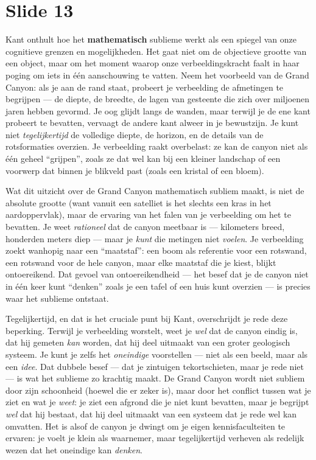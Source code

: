 \documentclass{article}
\begin{document}
\section*{Slide 13}

Kant onthult hoe het \textbf{mathematisch} sublieme werkt als een spiegel van onze cognitieve grenzen en mogelijkheden. Het gaat niet om de objectieve grootte van een object, maar om het moment waarop onze verbeeldingskracht faalt in haar poging om iets in één aanschouwing te vatten. Neem het voorbeeld van de Grand Canyon: als je aan de rand staat, probeert je verbeelding de afmetingen te begrijpen — de diepte, de breedte, de lagen van gesteente die zich over miljoenen jaren hebben gevormd. Je oog glijdt langs de wanden, maar terwijl je de ene kant probeert te bevatten, vervaagt de andere kant alweer in je bewustzijn. Je kunt niet \textit{tegelijkertijd} de volledige diepte, de horizon, en de details van de rotsformaties overzien. Je verbeelding raakt overbelast: ze kan de canyon niet als één geheel ``grijpen'', zoals ze dat wel kan bij een kleiner landschap of een voorwerp dat binnen je blikveld past (zoals een kristal of een bloem).

Wat dit uitzicht over de Grand Canyon mathematisch subliem maakt, is niet de absolute grootte (want vanuit een satelliet is het slechts een kras in het aardoppervlak), maar de ervaring van het falen van je verbeelding om het te bevatten. Je weet \textit{rationeel} dat de canyon meetbaar is — kilometers breed, honderden meters diep — maar je \textit{kunt} die metingen niet \textit{voelen}. Je verbeelding zoekt wanhopig naar een ``maatstaf'': een boom als referentie voor een rotswand, een rotswand voor de hele canyon, maar elke maatstaf die je kiest, blijkt ontoereikend. Dat gevoel van ontoereikendheid — het besef dat je de canyon niet in één keer kunt ``denken'' zoals je een tafel of een huis kunt overzien — is precies waar het sublieme ontstaat.

Tegelijkertijd, en dat is het cruciale punt bij Kant, overschrijdt je rede deze beperking. Terwijl je verbeelding worstelt, weet je \textit{wel} dat de canyon eindig is, dat hij gemeten \textit{kan} worden, dat hij deel uitmaakt van een groter geologisch systeem. Je kunt je zelfs het \textit{oneindige} voorstellen — niet als een beeld, maar als een \textit{idee}. Dat dubbele besef — dat je zintuigen tekortschieten, maar je rede niet — is wat het sublieme zo krachtig maakt. De Grand Canyon wordt niet subliem door zijn schoonheid (hoewel die er zeker is), maar door het conflict tussen wat je ziet en wat je \textit{weet}: je ziet een afgrond die je niet kunt bevatten, maar je begrijpt \textit{wel} dat hij bestaat, dat hij deel uitmaakt van een systeem dat je rede wel kan omvatten. Het is alsof de canyon je dwingt om je eigen kennisfaculteiten te ervaren: je voelt je klein als waarnemer, maar tegelijkertijd verheven als redelijk wezen dat het oneindige kan \textit{denken}.
\end{document}
